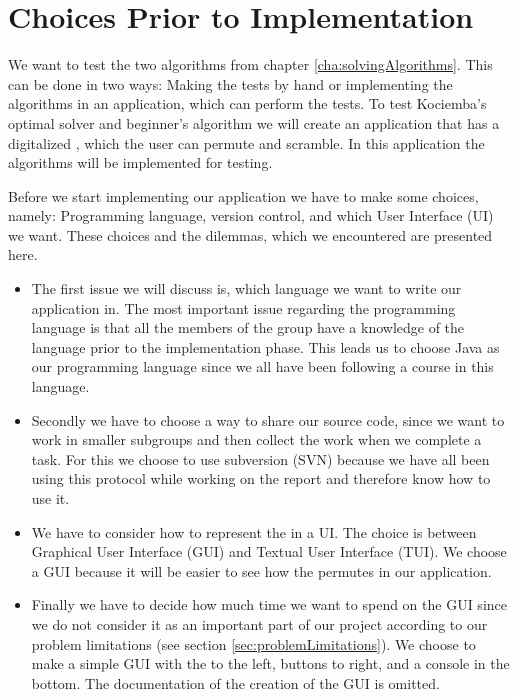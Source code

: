 \chapter{Choices Prior to Implementation}
\label{cha:choicesPriorToImplementation}
We want to test the two algorithms from chapter \ref{cha:solvingAlgorithms}.
This can be done in two ways: Making the tests by hand or implementing the algorithms in an application, which can perform the tests.
To test Kociemba's optimal solver and beginner's algorithm we will create an application that has a digitalized \rubik{}, which the user can permute and scramble.
In this application the algorithms will be implemented for testing.


Before we start implementing our application we have to make some choices, namely: Programming language, version control, and which User Interface (UI) we want.
These choices and the dilemmas, which we encountered are presented here.

\begin{itemize}
	\item The first issue we will discuss is, which language we want to write our application in.
The most important issue regarding the programming language is that all the members of the group have a knowledge of the language prior to the implementation phase.
This leads us to choose Java as our programming language since we all have been following a course in this language.

	\item Secondly we have to choose a way to share our source code, since we want to work in smaller subgroups and then collect the work when we complete a task.
For this we choose to use subversion (SVN) because we have all been using this protocol while working on the report and therefore know how to use it.

	\item We have to consider how to represent the \rubik{} in a UI. The choice is between Graphical User Interface (GUI) and Textual User Interface (TUI). We choose a GUI because it will be easier to see how the \rubik{} permutes in our application.
	  
	\item Finally we have to decide how much time we want to spend on the GUI since we do not consider it as an important part of our project according to our problem limitations (see section \ref{sec:problemLimitations}).
We choose to make a simple GUI with the \rubik{} to the left, buttons to right, and a console in the bottom.
The documentation of the creation of the GUI is omitted.
\end{itemize}
